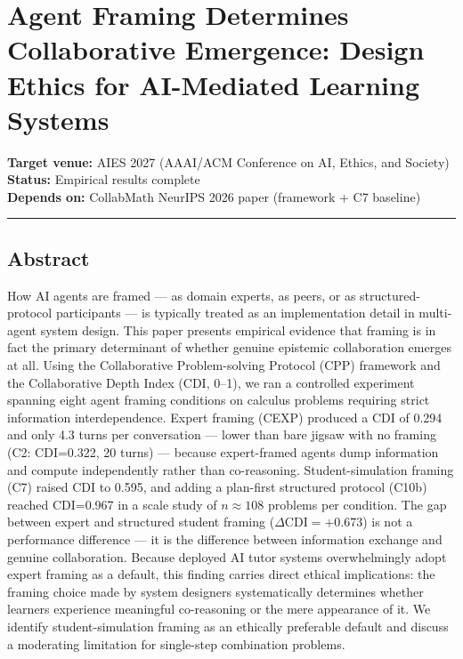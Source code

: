 \documentclass[
  11pt,
]{article}
\author{}
\date{}
\begin{document}
\section{Agent Framing Determines Collaborative Emergence: Design Ethics for AI-Mediated Learning Systems}\label{agent-framing-determines-collaborative-emergence-design-ethics-for-ai-mediated-learning-systems}

\textbf{Target venue:} AIES 2027 (AAAI/ACM Conference on AI, Ethics, and Society)\\
\textbf{Status:} Empirical results complete\\
\textbf{Depends on:} CollabMath NeurIPS 2026 paper (framework + C7 baseline)

\begin{center}\rule{0.5\linewidth}{0.5pt}\end{center}

\subsection{Abstract}\label{abstract}

How AI agents are framed --- as domain experts, as peers, or as
structured-protocol participants --- is typically treated as an
implementation detail in multi-agent system design. This paper presents
empirical evidence that framing is in fact the primary determinant of
whether genuine epistemic collaboration emerges at all. Using the
Collaborative Problem-solving Protocol (CPP) framework and the
Collaborative Depth Index (CDI, 0--1), we ran a controlled experiment
spanning eight agent framing conditions on calculus problems requiring
strict information interdependence. Expert framing (CEXP) produced a CDI
of 0.294 and only 4.3 turns per conversation --- lower than bare jigsaw
with no framing (C2: CDI=0.322, 20 turns) --- because expert-framed
agents dump information and compute independently rather than
co-reasoning. Student-simulation framing (C7) raised CDI to 0.595, and
adding a plan-first structured protocol (C10b) reached CDI=0.967 in a
scale study of $n \approx 108$ problems per condition. The gap between
expert and structured student framing ($\Delta\mathrm{CDI} = +0.673$)
is not a performance difference --- it is the difference between
information exchange and genuine collaboration. Because deployed AI tutor
systems overwhelmingly adopt expert framing as a default, this finding
carries direct ethical implications: the framing choice made by system
designers systematically determines whether learners experience
meaningful co-reasoning or the mere appearance of it. We identify
student-simulation framing as an ethically preferable default and
discuss a moderating limitation for single-step combination problems.
\end{document}
